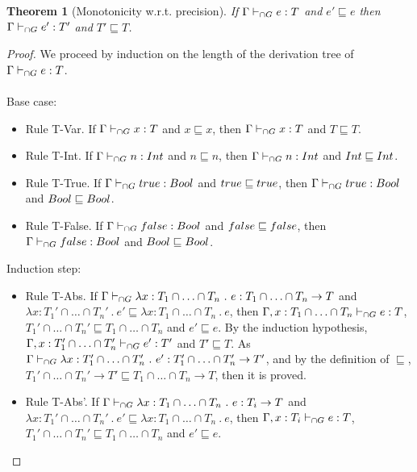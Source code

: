 \documentclass[a4paper]{article}
\newtheorem{theorem}{Theorem}
\begin{document}
\begin{theorem}[Monotonicity w.r.t. precision]
\label{monotonicity_wtr_precision}
If $\Gamma \vdash_{\cap G} e : T$ and $e' \sqsubseteq e$ then $\Gamma \vdash_{\cap G} e' : T'$ and $T' \sqsubseteq T$.
\end{theorem}
\begin{proof}
We proceed by induction on the length of the derivation tree of $\Gamma \vdash_{\cap G} e : T$.\\\\
Base case:
\begin{itemize}
    \item Rule T-Var.
    If $\Gamma \vdash_{\cap G} x : T$ and $x \sqsubseteq x$, then $\Gamma \vdash_{\cap G} x : T$ and $T \sqsubseteq T$.
    \item Rule T-Int.
    If $\Gamma \vdash_{\cap G} n : {Int}$ and $n \sqsubseteq n$, then $\Gamma \vdash_{\cap G} n : {Int}$ and ${Int} \sqsubseteq {\ensuremath{Int}}$.
    \item Rule T-True.
    If $\Gamma \vdash_{\cap G} true : Bool$ and $true \sqsubseteq true$, then $\Gamma \vdash_{\cap G} true : Bool$ and $Bool \sqsubseteq Bool$.
    \item Rule T-False.
    If $\Gamma \vdash_{\cap G} false : Bool$ and $false \sqsubseteq false$, then $\Gamma \vdash_{\cap G} false : Bool$ and $Bool \sqsubseteq Bool$.
\end{itemize}
Induction step:
\begin{itemize}
    \item Rule T-Abs.
    If $\Gamma \vdash_{\cap G} \lambda x : T_1 \cap \ldots \cap T_n\ .\ e : T_1 \cap \ldots \cap T_n \rightarrow T$ and $\lambda x : T_1' \cap \ldots \cap T_n'\ .\ e' \sqsubseteq \lambda x : T_1 \cap \ldots \cap T_n\ .\ e$, then $\Gamma, x : T_1 \cap \ldots \cap T_n \vdash_{\cap G} e : T$, $T_1' \cap \ldots \cap T_n' \sqsubseteq T_1 \cap \ldots \cap T_n$ and $e' \sqsubseteq e$.
    By the induction hypothesis, $\Gamma, x : T_1' \cap \ldots \cap T_n' \vdash_{\cap G} e' : T'$ and $T' \sqsubseteq T$.
    As $\Gamma \vdash_{\cap G} \lambda x : T_1' \cap \ldots \cap T_n'\ .\ e' : T_1' \cap \ldots \cap T_n' \rightarrow T'$, and by the definition of $\sqsubseteq$, $T_1' \cap \ldots \cap T_n' \rightarrow T' \sqsubseteq T_1 \cap \ldots \cap T_n \rightarrow T$, then it is proved.
    \item Rule T-Abs'.
    If $\Gamma \vdash_{\cap G} \lambda x : T_1 \cap \ldots \cap T_n\ .\ e : T_i \rightarrow T$ and $\lambda x : T_1' \cap \ldots \cap T_n'\ .\ e' \sqsubseteq \lambda x : T_1 \cap \ldots \cap T_n\ .\ e$, then $\Gamma, x : T_i \vdash_{\cap G} e : T$, $T_1' \cap \ldots \cap T_n' \sqsubseteq T_1 \cap \ldots \cap T_n$ and $e' \sqsubseteq e$.

\end{itemize}
\end{proof}
\end{document}
